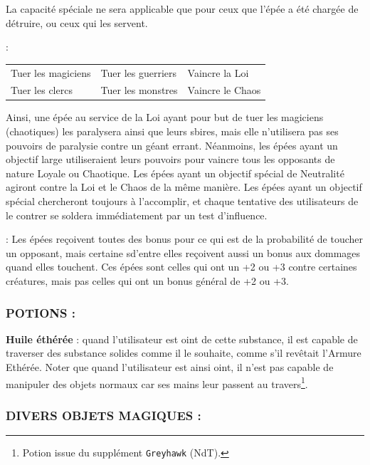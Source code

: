 \documentclass[11pt]{article}
\newcommand{\myunderline}[1]{\underline{\smash{#1}}}
\begin{document}
{{\bigskip

La capacité spéciale ne sera applicable que pour ceux que l'épée a été chargée de détruire, ou ceux qui les servent.

\myunderline{\textbf{Objectifs}}:

\medskip

{\parindent1.5cm\begin{tabular}{p{4.6cm}p{4.6cm}p{4.6cm}}
Tuer les magiciens & Tuer les guerriers & Vaincre la Loi \\
Tuer les clercs & Tuer les monstres & Vaincre le Chaos \\
\end{tabular}}

\bigskip

Ainsi, une épée au service de la Loi ayant pour but de tuer les magiciens (chaotiques) les paralysera ainsi que leurs sbires, mais elle n'utilisera pas ses pouvoirs de paralysie contre un géant errant. Néanmoins, les épées ayant un objectif large utiliseraient leurs pouvoirs pour vaincre tous les opposants de nature Loyale ou Chaotique. Les épées ayant un objectif spécial de Neutralité agiront contre la Loi et le Chaos de la même manière. Les épées ayant un objectif spécial chercheront toujours à l'accomplir, et chaque tentative des utilisateurs de le contrer se soldera immédiatement par un test d'influence.

\bigskip

\myunderline{\textbf{EPEES, BONUS AUX DOMMAGES}} : Les épées reçoivent toutes des bonus pour ce qui est de la probabilité de toucher un opposant, mais certaine sd'entre elles reçoivent aussi un bonus aux dommages quand elles touchent. Ces épées sont celles qui ont un +2 ou +3 contre certaines créatures, mais pas celles qui ont un bonus général de +2 ou +3.

\subsubsection*{POTIONS :}

\textbf{Huile éthérée} : quand l'utilisateur est oint de cette substance, il est capable de traverser des substance solides comme il le souhaite, comme s'il revêtait l'Armure Ethérée. Noter que quand l'utilisateur est ainsi oint, il n'est pas capable de manipuler des objets normaux car ses mains leur passent au travers\footnote{Potion issue du supplément \texttt{Greyhawk} (NdT).}.

\subsubsection*{DIVERS OBJETS MAGIQUES :}

}}
\end{document}
